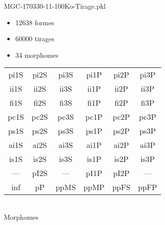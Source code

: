MGC-170330-11-100Ko-Tirage.pkl
\begin{itemize}
\item 12638 formes
\item 60000 tirages
\item 34 morphomes
\end{itemize}
\begin{center}
\begin{tabular}{cccccc}
\hline
\cellcolor{white}pi1S & \cellcolor{orange}pi2S & \cellcolor{orange}pi3S & \cellcolor{white}pi1P & \cellcolor{white}pi2P & \cellcolor{white}pi3P\\
\cellcolor{brown}ii1S & \cellcolor{brown}ii2S & \cellcolor{brown}ii3S & \cellcolor{white}ii1P & \cellcolor{white}ii2P & \cellcolor{brown}ii3P\\
\cellcolor{yellow}fi1S & \cellcolor{lime}fi2S & \cellcolor{lime}fi3S & \cellcolor{green}fi1P & \cellcolor{white}fi2P & \cellcolor{green}fi3P\\
\cellcolor{yellow}pc1S & \cellcolor{yellow}pc2S & \cellcolor{yellow}pc3S & \cellcolor{white}pc1P & \cellcolor{white}pc2P & \cellcolor{yellow}pc3P\\
\cellcolor{teal}ps1S & \cellcolor{white}ps2S & \cellcolor{teal}ps3S & \cellcolor{white}ps1P & \cellcolor{white}ps2P & \cellcolor{teal}ps3P\\
\cellcolor{white}ai1S & \cellcolor{lightgray}ai2S & \cellcolor{lightgray}ai3S & \cellcolor{white}ai1P & \cellcolor{blue}ai2P & \cellcolor{white}ai3P\\
\cellcolor{pink}is1S & \cellcolor{white}is2S & \cellcolor{lightgray}is3S & \cellcolor{white}is1P & \cellcolor{black}is2P & \cellcolor{pink}is3P\\
--- & \cellcolor{white}pI2S & --- & \cellcolor{white}pI1P & \cellcolor{blue}pI2P & ---\\
\cellcolor{white}inf & \cellcolor{white}pP & \cellcolor{white}ppMS & \cellcolor{white}ppMP & \cellcolor{white}ppFS & \cellcolor{white}ppFP\\
\hline
\end{tabular}\\
Morphomes
\end{center}
\bigskip

